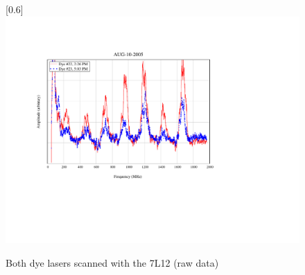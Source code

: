 \begin{figure}
\scalebox{0.8}[0.6]{
\includegraphics[viewport=150 200 300 450, bb=85 160 300 550]
{2X-12/2X-12.pdf}
}
\caption{Both dye lasers scanned with the 7L12 (raw data)}
\label{2X-12}
\end{figure}
